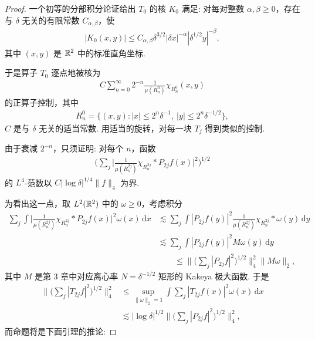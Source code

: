 \begin{proof}
一个初等的分部积分论证给出 $T_0$ 的核 $K_0$ 满足: 对每对整数 $\alpha, \beta \geq 0$，存在与 $\delta$ 无关的有限常数 $C_{\alpha,\beta}$，使
\begin{align*}
  |K_{0}(x,y)|\leq C_{\alpha,\beta}\delta^{3/2}|\delta x|^{-\alpha}|\delta^{1/2}y|^{-\beta},
\end{align*}
其中 $(x, y)$ 是 $\mathbb{R}^2$ 中的标准直角坐标.

于是算子 $T_{0}$ 逐点地被核为
\begin{align*}
  C\sum_{n=0}^{\infty}2^{-n}\frac{1}{\mu(R_{n}^{0})}\chi_{R_{n}^{0}}(x,y)
\end{align*}
的正算子控制，其中
\begin{align*}
  R_{n}^{0}=\{(x,y):|x|\leq 2^{n}\delta^{-1},\ |y|\leq 2^{n}\delta^{-1/2}\},
\end{align*}
$C$ 是与 $\delta$ 无关的适当常数. 用适当的旋转，对每一块 $T_{j}$ 得到类似的控制.

由于衰减 $2^{-n}$，只须证明: 对每个 $n$，函数
\begin{align*}
  \Big(\sum_{j}\Big|\frac{1}{\mu(R_{n}^{2j})}\chi_{R_{n}^{2j}}*P_{2j}f(x)\Big|^{2}\Big)^{1/2}
\end{align*}
的 $L^{4}$-范数以 $C|\log\delta|^{1/4}\|f\|_{4}$ 为界.

为看出这一点，取 $L^2(\mathbb{R}^2)$ 中的 $\omega \geq 0$，考虑积分
\begin{align*}
  \sum_{j}\int\Big|\frac{1}{\mu(R_{n}^{2j})}\chi_{R_{n}^{2j}}*P_{2j}f(x)\Big|^{2}\omega(x)\,\mathrm{d}x
  &\lesssim\sum_{j}\int|P_{2j}f(y)|^{2}\frac{1}{\mu(R_{n}^{2j})}\chi_{R_{n}^{2j}}*\omega(y)\,\mathrm{d}y\\
  &\lesssim\sum_{j}\int|P_{2j}f(y)|^{2}M\omega(y)\,\mathrm{d}y\\
  &\qquad\leq\Big\|\Big(\sum_{j}|P_{2j}f|^{2}\Big)^{1/2}\Big\|_{4}^{2}\|M\omega\|_{2},
\end{align*}
其中 $M$ 是第 3 章中对应离心率 $N = \delta^{-1/2}$ 矩形的 Kakeya 极大函数. 于是
\begin{align*}
  \Big\|\Big(\sum_{j}|T_{2j}f|^{2}\Big)^{1/2}\Big\|_{4}^{2}
  &\leq\sup_{\|\omega\|_{2}=1}\int\sum_{j}|T_{2j}f(x)|^{2}\omega(x)\,\mathrm{d}x\\
  &\lesssim|\log\delta|^{1/2}\Big\|\Big(\sum_{j}|P_{2j}f|^{2}\Big)^{1/2}\Big\|_{4}^{2},
\end{align*}
而命题将是下面引理的推论:
\end{proof}

